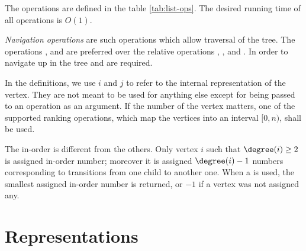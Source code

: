 The operations are defined in the table \ref{tab:list-ops}.
The desired running time of all operations is $O(1)$.

\emph{Navigation operations} are such operations which allow traversal of the tree.
The operations \childRank{}, \childSelect{} and \degree{} are preferred over the relative operations \childPrev{}, \childNext{}, \childFirst{} and \childLast{}.
In order to navigate up in the tree \parent{} and \isRoot{} are required.

In the definitions, we use $i$ and $j$ to refer to the internal representation of the vertex.
They are not meant to be used for anything else except for being passed to an operation as an argument.
If the number of the vertex matters, one of the supported ranking operations, which map the vertices into an interval $[0, n)$, shall be used.

The in-order \rank{} is different from the others.
Only vertex $i$ such that $\degree(i) \ge 2$ is assigned in-order number; moreover it is assigned $\degree(i) - 1$ numbers corresponding to transitions from one child to another one.
When a \inRank{} is used, the smallest assigned in-order number is returned, or $-1$ if a vertex was not assigned any.

\section{Representations}


